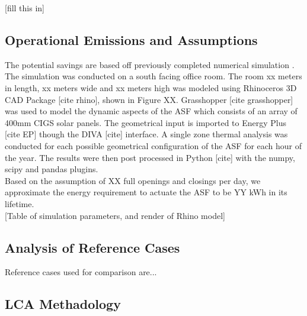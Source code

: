 [fill this in]


\subsection{Operational Emissions and Assumptions}

The potential savings are based off previously completed numerical simulation \cite{jayathissa2015abs}. The simulation was conducted on a south facing office room. The room xx meters in length, xx meters wide and xx meters high was modeled using Rhinoceros 3D CAD Package [cite rhino], shown in Figure XX. Grasshopper [cite grasshopper] was used to model the dynamic aspects of the ASF which consists of an array of 400mm CIGS solar panels. The geometrical input is imported to Energy Plus [cite EP] though the DIVA [cite] interface. A single zone thermal analysis was conducted for each possible geometrical configuration of the ASF for each hour of the year. The results were then post processed in Python [cite] with the numpy, scipy and pandas plugins. \\

Based on the assumption of XX full openings and closings per day, we approximate the energy requirement to actuate the ASF to be YY kWh in its lifetime.\\

[Table of simulation parameters, and render of Rhino model]


\subsection{Analysis of Reference Cases}

Reference cases used for comparison are...


\subsection{LCA Methadology}



